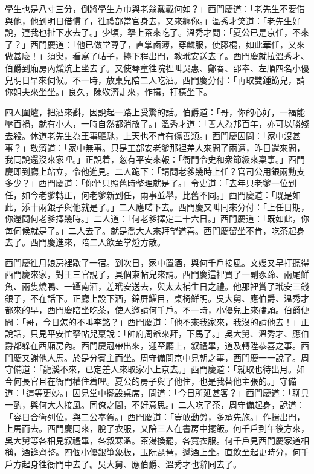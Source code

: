 學生也是八寸三分，倒將學生方巾與老翁戴戴何如？」西門慶道：「老先生不要借與他，他到明日借慣了，徃禮部當官身去，又來纏你。」溫秀才笑道：「老先生好說，連我也扯下水去了。」少頃，拏上茶來吃了。溫秀才問：「夏公已是京任，不來了？」{}西門慶道：「他已做堂尊了，直掌鹵簿，穿麟服，使藤棍，如此華任，又來做甚麼！」須臾，看寫了帖子，擡下程出門，教玳安送去了。西門慶就拉溫秀才、伯爵到廂房內煖炕上坐去了。又使琴童徃院裡叫吳惠、鄭春、邵奉、左順四名小優兒明日早來伺候。不一時，放桌兒陪二人吃酒。西門慶分付：「再取雙鍾筯兒，請你姐夫來坐坐。」良久，陳敬濟走來，作揖，打橫坐下。

四人圍爐，把酒來斟，因說起一路上受驚的話。伯爵道：「哥，你的心好，一福能壓百禍，就有小人，一時自然都消散了。」溫秀才道：「善人為邦百年，亦可以勝殘去殺。休道老先生為王事驅馳，上天也不肯有傷善類。」{}西門慶因問：「家中沒甚事？」敬濟道：「家中無事。只是工部安老爹那裡差人來問了兩遭，昨日還來問，我囘說還沒來家哩。」正說着，忽有平安來報：「衙門令史和衆節級來稟事。」西門慶即到廳上站立，令他進見。二人跪下：「請問老爹幾時上任？官司公用銀兩動支多少？」西門慶道：「你們只照舊時整理就是了。」令史道：「去年只老爹一位到任，如今老爹轉正，何老爹新到任，兩事並舉，比舊不同。」西門慶道：「既是如此，添十兩銀子與他就是了。」二人應喏下去。西門慶又叫囘來分付：「上任日期，你還問何老爹擇幾時。」二人道：「何老爹擇定二十六日。」西門慶道：「既如此，你每伺候就是了。」二人去了。就是喬大人來拜望道喜。西門慶留坐不肯，吃茶起身去了。西門慶進來，陪二人飲至掌燈方散。

西門慶徃月娘房裡歇了一宿。到次日，家中置酒，與何千戶接風。文嫂又早打聽得西門慶來家，對王三官說了，具個柬帖兒來請。西門慶這裡買了一副豕蹄、兩尾鮮魚、兩隻燒鴨、一罈南酒，差玳安送去，與太太補生日之禮。他那裡賞了玳安三錢銀子，不在話下。正廳上設下酒，錦屏耀目，桌椅鮮明。吳大舅、應伯爵、溫秀才都來的早，西門慶陪坐吃茶，使人邀請何千戶。不一時，小優兒上來磕頭。伯爵便問：「哥，今日怎的不叫李銘？」西門慶道：「他不來我家來，我沒的請他去！」{}正說話，只見平安忙拏帖兒稟說：「帥府周爺來拜，下馬了。」吳大舅、溫秀才、應伯爵都躲在西廂房內。西門慶冠帶出來，迎至廳上，叙禮畢，道及轉陞恭喜之事。西門慶又謝他人馬。於是分賓主而坐。周守備問京中見朝之事，西門慶一一說了。周守備道：「龍溪不來，已定差人來取家小上京去。」西門慶道：「就取也待出月。如今何長官且在衙門權住着哩。夏公的房子與了他住，也是我替他主張的。」守備道：「這等更妙。」因見堂中擺設桌席，問道：「今日所延甚客？」西門慶道：「聊具一酌，與何大人接風。同僚之間，不好意思。」二人吃了茶，周守備起身，說道：「容日合衛列位，與二公奉賀。」西門慶道：「豈敢動勞，多承先施。」作揖出門，上馬而去。西門慶囘來，脫了衣服，又陪三人在書房中擺飯。何千戶到午後方來，吳大舅等各相見叙禮畢，各叙寒溫。茶湯換罷，各寬衣服。何千戶見西門慶家道相稱，酒筵齊整。四個小優銀箏象板，玉阮琵琶，遞酒上坐。直飲至起更時分，何千戶方起身徃衙門中去了。吳大舅、應伯爵、溫秀才也辭囘去了。

